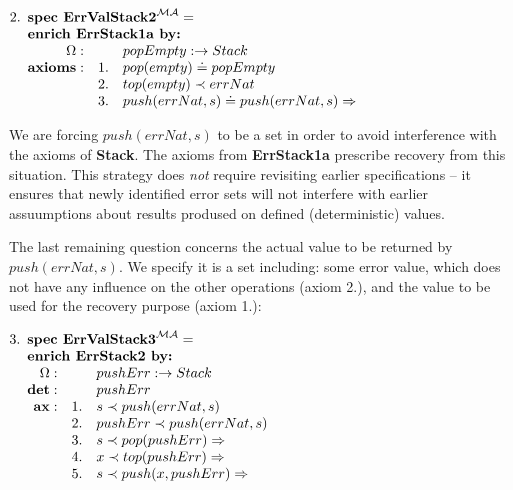 \documentclass[10pt]{article}
\begin{document}
\(
2. \spec{	\tit{\mbox{\bf spec\ ErrValStack2}^{\inst{MA}}=} \\
	\tit{\mbox{\bf enrich\ ErrStack1a\  by:}} \\
	    	\Ops:	&& popEmpty: \to Stack\\
	 	{\bf axioms:}
			&1.& pop(empty) \eleq popEmpty \\
			&2.& top(empty) \prec errNat \\
			&3.& push(errNat,s)\eleq push(errNat,s) \To
}
\)

\noindent
We are forcing $push(errNat,s)$ to be a set in order to avoid interference
with the axioms of {\bf Stack}. The axioms from {\bf ErrStack1a} prescribe
recovery from this situation. This strategy does {\em not} require revisiting
earlier specifications -- it ensures that newly identified error sets will
not interfere with earlier assuumptions about results prodused on defined
(deterministic) values.

The last remaining question concerns the actual value to be returned by
$push(errNat,s)$. We  specify it is a set including:
some
error value, which does not have any influence on the other operations (axiom
2.), and
the value to be used for the recovery purpose (axiom 1.):

\(
3. \spec{	\tit{\mbox{\bf spec\ ErrValStack3}^{\inst{MA}}=} \\
	\tit{\mbox{\bf enrich\ ErrStack2\  by:}} \\
	    	\Ops:	&& pushErr: \to Stack\\
		{\bf det:} && pushErr \\
	 	{\bf ax:}
			&1.& s\prec push(errNat,s) \\
			&2.& pushErr\prec push(errNat,s) \\
			&3.& s\prec pop(pushErr) \To \\
			&4.& x\prec top(pushErr) \To \\
			&5.& s\prec push(x,pushErr) \To
}
\)
\end{document}
